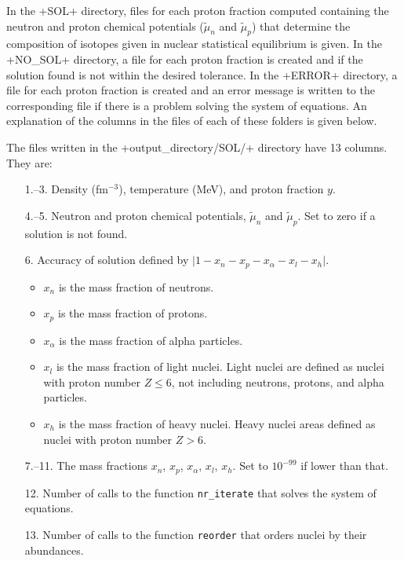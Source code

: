 \documentclass[letterpaper,11pt]{refart}
\begin{document}
In the \verbfile+SOL+ directory, files for each proton fraction computed 
containing the neutron and proton chemical potentials ($\tilde\mu_n$ and 
$\tilde\mu_p$) that determine the composition of isotopes given in nuclear 
statistical equilibrium is given. 
In the \verbfile+NO_SOL+ directory, a file for each proton fraction is 
created and if the solution found is not within the desired tolerance. 
In the \verbfile+ERROR+ directory, a file for each proton fraction is 
created and an error message is written to the corresponding file if there 
is a problem solving the system of equations. 
An explanation of the columns in the files of each of these folders is 
given below.


The files written in the \verbfile+output_directory/SOL/+ directory have
13 columns.  They are:

\begin{enumerate}
 \item[1.--3.] Density (fm$^{-3}$), temperature (MeV), and proton
   fraction $y$.
 \item[4.--5.] Neutron and proton chemical potentials, 
   $\tilde\mu_n$ and $\tilde\mu_p$. Set to zero if a solution is not found. 
 \item[6.] Accuracy of solution defined by $\vert1-x_n-x_p-x_\alpha-x_l-x_h\vert$.
  \begin{itemize}
   \item $x_n$ is the mass fraction of neutrons.
   \item $x_p$ is the mass fraction of protons.
   \item $x_\alpha$ is the mass fraction of alpha particles. 
   \item $x_l$ is the mass fraction of light nuclei. 
         Light nuclei are defined as nuclei with proton number $Z\leq6$,
         not including neutrons, protons, and alpha particles.
   \item $x_h$ is the mass fraction of heavy nuclei. Heavy nuclei areas
         defined as nuclei with proton number $Z>6$.
  \end{itemize}
 \item[7.--11.] The mass fractions $x_n$, $x_p$, $x_\alpha$, $x_l$, $x_h$.
                Set to $10^{-99}$ if lower than that. 
 \item[12.] Number of calls to the function \texttt{nr\_iterate} that solves
            the system of equations. 
 \item[13.] Number of calls to the function \texttt{reorder} that orders
            nuclei by their abundances. 
\end{enumerate}
\end{document}
